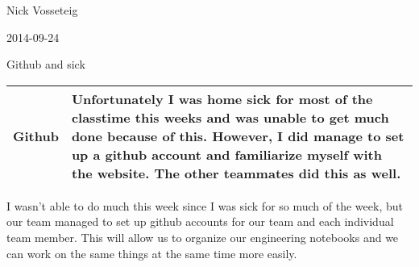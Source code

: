 Nick Vosseteig

2014-09-24

Github and sick

\begin{tabular}{|p{5cm}|p{5cm}|}
 \hline
Github
&
Unfortunately I was home sick for most of the classtime this weeks and was unable to get much done because of this. However, I did manage to set up a github account and familiarize myself with the website. The other teammates did this as well.
 \\
 \hline
\end{tabular}

I wasn't able to do much this week since I was sick for so much of the week, but our team managed to set up github accounts for our team and each individual team member. This will allow us to organize our engineering notebooks and we can work on the same things at the same time more easily. 
